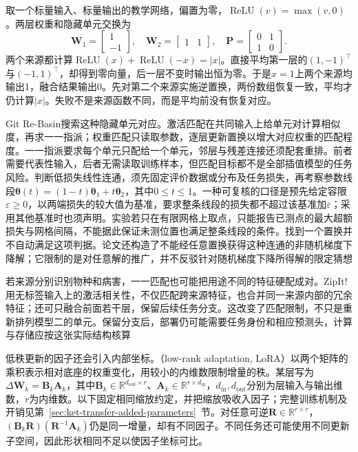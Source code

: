 \begin{example}[完全相同的函数也不能直接平均]
  \label{ex:ket-integration-permutation}
  取一个标量输入、标量输出的教学网络，偏置为零，$\operatorname{ReLU}(v)=\max(v,0)$。两层权重和隐藏单元交换为
  \[
    \bm{W}_1=\begin{bmatrix}1\\-1\end{bmatrix},\quad
    \bm{W}_2=\begin{bmatrix}1&1\end{bmatrix},\quad
    \bm{P}=\begin{bmatrix}0&1\\1&0\end{bmatrix}.
  \]
  两个来源都计算$\operatorname{ReLU}(x)+\operatorname{ReLU}(-x)=|x|$。直接平均第一层的$(1,-1)^\top$与$(-1,1)^\top$，却得到零向量，后一层不变时输出恒为零。于是$x=1$上两个来源均输出1，融合结果输出0。先对第二个来源实施逆置换，两份数组恢复一致，平均才仍计算$|x|$。失败不是来源函数不同，而是平均前没有恢复对应。
\end{example}

Git Re-Basin搜索这种隐藏单元对应。激活匹配在共同输入上给单元对计算相似度，再求一一指派；权重匹配只读取参数，逐层更新置换以增大对应权重的匹配程度。一一指派要求每个单元只配给一个单元，邻层与残差连接还须配套重排。前者需要代表性输入，后者无需读取训练样本，但匹配目标都不是全部插值模型的任务风险。判断低损失线性连通，须先固定评价数据或分布及任务损失，再考察参数线段$\bm{\theta}(t)=(1-t)\bm{\theta}_1+t\bm{\theta}_2$，其中$0\leq t\leq1$。一种可复核的口径是预先给定容限$\varepsilon\geq0$，以两端损失的较大值为基准，要求整条线段的损失都不超过该基准加$\varepsilon$；采用其他基准时也须声明。实验若只在有限网格上取点，只能报告已测点的最大超额损失与网格间隔，不能据此保证未测位置也满足整条线段的条件。找到一个置换并不自动满足这项判据。论文还构造了不能经任意置换获得这种连通的非随机梯度下降解；它限制的是对任意解的推广，并不反驳针对随机梯度下降所得解的限定猜想

若来源分别识别物种和病害，一一匹配也可能把用途不同的特征硬配成对。ZipIt!用无标签输入上的激活相关性，不仅匹配跨来源特征，也合并同一来源内部的冗余特征；还可只融合前面若干层，保留后续任务分支。这改变了匹配限制，不只是重新排列模型二的单元。保留分支后，部署仍可能需要任务身份和相应预测头，计算与存储应按这张实际结构核算

低秩更新的因子还会引入内部坐标。（low-rank adaptation, LoRA）以两个矩阵的乘积表示相对底座的权重变化，用较小的内维数限制增量的秩。某层写为$\Delta\bm{W}_k=\bm{B}_k\bm{A}_k$，其中$\bm{B}_k\in\mathbb{R}^{d_{\mathrm{out}}\times r}$、$\bm{A}_k\in\mathbb{R}^{r\times d_{\mathrm{in}}}$，$d_{\mathrm{in}},d_{\mathrm{out}}$分别为层输入与输出维数，$r$为内维数。以下固定相同缩放约定，并把缩放吸收入因子；完整训练机制及开销见第~\ref{sec:ket-transfer-added-parameters}~节。对任意可逆$\bm{R}\in\mathbb{R}^{r\times r}$，$(\bm{B}_k\bm{R})(\bm{R}^{-1}\bm{A}_k)$仍是同一增量，却有不同因子。不同任务还可能使用不同更新子空间，因此形状相同不足以使因子坐标可比。

